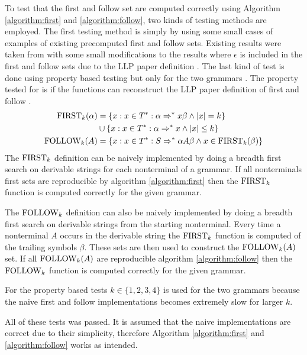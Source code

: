 To test that the first and follow set are computed correctly using Algorithm \ref{algorithm:first} and \ref{algorithm:follow}, two kinds of testing methods are employed. The first testing method is simply by using some small cases of examples of existing precomputed first and follow sets. Existing results were taken from \cite[58, 62, 63, 65]{Mogensen} with some small modifications to the results where $\epsilon$ is included in the first and follow sets due to the LLP paper definition \cite[5]{Vagner2007}. The last kind of test is done using property based testing but only for the two grammars \cite[62, 63]{Mogensen}. The property tested for is if the functions can reconstruct the LLP paper definition of first and follow \cite[5]{Vagner2007}.
\begin{align*}
    \text{FIRST}_k(\alpha) &= \{x : x \in T^* : \alpha \Rightarrow^* x \beta \land |x| = k\} \\ 
    \, &\cup \{x : x \in T^* : \alpha \Rightarrow^* x \land |x| \leq k\} \\
    \text{FOLLOW}_k(A) &= \{x : x \in T^* : S \Rightarrow^* \alpha A \beta \land x \in \text{FIRST}_k(\beta)\}
\end{align*}
The $\text{FIRST}_k$ definition can be naively implemented by doing a breadth first search on derivable strings for each nonterminal of a grammar. If all nonterminals first sets are reproducible by algorithm \ref{algorithm:first} then the $\text{FIRST}_k$ function is computed correctly for the given grammar.

The $\text{FOLLOW}_k$ definition can also be naively implemented by doing a breadth first search on derivable strings from the starting nonterminal. Every time a nonterminal $A$ occurs in the derivable string the $\text{FIRST}_k$ function is computed of the trailing symbols $\beta$. These sets are then used to construct the $\text{FOLLOW}_k(A)$ set. If all $\text{FOLLOW}_k(A)$ are reproducible algorithm \ref{algorithm:follow} then the $\text{FOLLOW}_k$ function is computed correctly for the given grammar.

For the property based tests $k \in \{1, 2, 3, 4\}$ is used for the two grammars because the naive first and follow implementations becomes extremely slow for larger $k$.

All of these tests was passed. It is assumed that the naive implementations are correct due to their simplicity, therefore Algorithm \ref{algorithm:first} and \ref{algorithm:follow} works as intended.